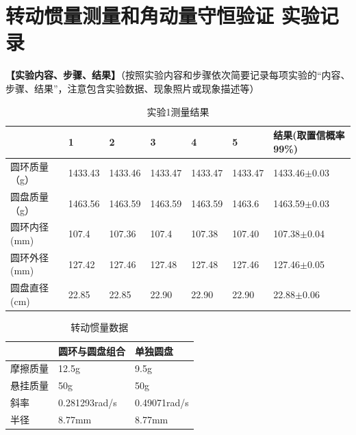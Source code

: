 \documentclass[dvipsnames, svgnames,a4paper,11pt]{article}
\begin{document}
\section{转动惯量测量和角动量守恒验证 \textbf{实验记录}}
\textbf{【实验内容、步骤、结果】}（按照实验内容和步骤依次简要记录每项实验的“内容、步骤、结果”，注意包含实验数据、现象照片或现象描述等）\\
\begin{table}[htbp]
	\renewcommand\arraystretch{1.7}
	\centering
    \caption{实验1测量结果}
	\begin{tabularx}{\textwidth}{|l|X|X|X|X|X|l|}
	\hline
	\diagbox{测量对象}{测量次序}&1&2&3&4&5&结果(取置信概率99\%)\\
	\hline
	圆环质量（g）& 1433.43 &1433.46&1433.47&1433.47&1433.47&1433.46$\pm$0.03  \\
	\hline
	圆盘质量（g）& 1463.56&1463.59&1463.59&1463.59&1463.6&1463.59$\pm$0.03  \\
	\hline
	圆环内径(mm)&107.4&107.36&107.4&107.38&107.40&107.38$\pm$0.04\\
	\hline
	圆环外径(mm)&127.42&127.46&127.48&127.48&127.46&127.46$\pm$0.05\\
	\hline
	圆盘直径(cm)&22.85&22.85&22.90&22.90&22.90&22.88$\pm$0.06\\
	\hline
	\end{tabularx}
\end{table}
\begin{table}[H]
	\renewcommand\arraystretch{1.7}
	\centering
    \caption{转动惯量数据}
	\begin{tabularx}{\textwidth}{|X|X|X|}
	\hline
	&圆环与圆盘组合&单独圆盘\\
	\hline
	摩擦质量&12.5g &9.5g \\
	\hline
	悬挂质量&50g &50g \\
	\hline
	斜率&0.281293rad/s &0.49071rad/s \\
	\hline
	半径&8.77mm &8.77mm \\
	\hline
	\end{tabularx}
\end{table}
\end{document}
